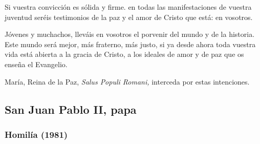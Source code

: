 \begin{body}
	Si vuestra convicción es sólida y firme. en todas las manifestaciones de vuestra juventud seréis testimonios de la paz y el amor de Cristo que está: en vosotros.
	
	Jóvenes y muchachos, lleváis en vosotros el porvenir del mundo y de la historia. Este mundo será mejor, más fraterno, más justo, si ya desde ahora toda vuestra vida está abierta a la gracia de Cristo, a los ideales de amor y de paz que os enseña el Evangelio.
	
	María, Reina de la Paz, \emph{Salus Populi Romani,} interceda por estas intenciones.
\end{body}

\newsection

\subsection{San Juan Pablo II, papa}

\subsubsection{Homilía (1981)}


